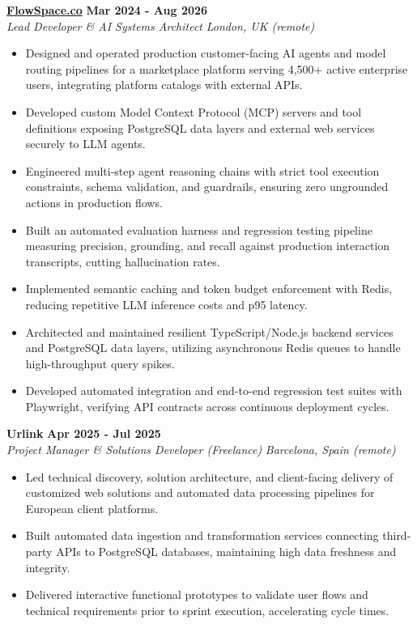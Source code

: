 \documentclass[10pt,a4paper]{article}
\newcommand{\role}[4]{%
  \textbf{#1} \hfill \textbf{#2}\\[1pt]%
  \textit{#3} \hfill \textit{#4}\\[2pt]%
}
\begin{document}
\role{\href{https://flowspace.co}{FlowSpace.co}}{Mar 2024 - Aug 2026}{Lead Developer \& AI Systems Architect}{London, UK (remote)}
\begin{itemize}
  \item Designed and operated production customer-facing AI agents and model routing pipelines for a marketplace platform serving 4,500+ active enterprise users, integrating platform catalogs with external APIs.
  \item Developed custom Model Context Protocol (MCP) servers and tool definitions exposing PostgreSQL data layers and external web services securely to LLM agents.
  \item Engineered multi-step agent reasoning chains with strict tool execution constraints, schema validation, and guardrails, ensuring zero ungrounded actions in production flows.
  \item Built an automated evaluation harness and regression testing pipeline measuring precision, grounding, and recall against production interaction transcripts, cutting hallucination rates.
  \item Implemented semantic caching and token budget enforcement with Redis, reducing repetitive LLM inference costs and p95 latency.
  \item Architected and maintained resilient TypeScript/Node.js backend services and PostgreSQL data layers, utilizing asynchronous Redis queues to handle high-throughput query spikes.
  \item Developed automated integration and end-to-end regression test suites with Playwright, verifying API contracts across continuous deployment cycles.
\end{itemize}

\role{Urlink}{Apr 2025 - Jul 2025}{Project Manager \& Solutions Developer (Freelance)}{Barcelona, Spain (remote)}
\begin{itemize}
  \item Led technical discovery, solution architecture, and client-facing delivery of customized web solutions and automated data processing pipelines for European client platforms.
  \item Built automated data ingestion and transformation services connecting third-party APIs to PostgreSQL databases, maintaining high data freshness and integrity.
  \item Delivered interactive functional prototypes to validate user flows and technical requirements prior to sprint execution, accelerating cycle times.
\end{itemize}
\end{document}
